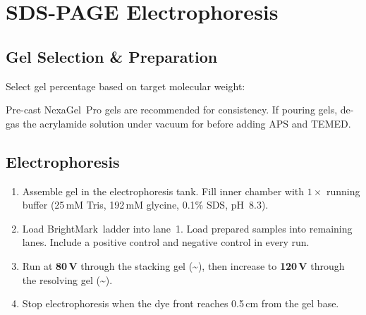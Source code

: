 
\section{SDS-PAGE Electrophoresis}

\subsection{Gel Selection \& Preparation}

Select gel percentage based on target molecular weight:

\par\vspace{4pt}
\begin{center}
\end{center}

\par\vspace{6pt}
Pre-cast NexaGel\texttrademark~Pro gels are recommended for consistency. If
pouring gels, de-gas the acrylamide solution under vacuum for  before
adding APS and TEMED.

\subsection{Electrophoresis}

\begin{enumerate}
  \item Assemble gel in the electrophoresis tank. Fill inner chamber with $1\times$
        running buffer (25\,mM Tris, 192\,mM glycine, 0.1\% SDS, pH~8.3).
  \item Load  BrightMark\texttrademark~ladder into lane~1. Load prepared
        samples into remaining lanes. Include a positive control and negative control
        in every run.
  \item Run at \textbf{80\,V} through the stacking gel (\textasciitilde{}),
        then increase to \textbf{120\,V} through the resolving gel
        (\textasciitilde{}).
  \item Stop electrophoresis when the dye front reaches 0.5\,cm from the gel base.
\end{enumerate}

